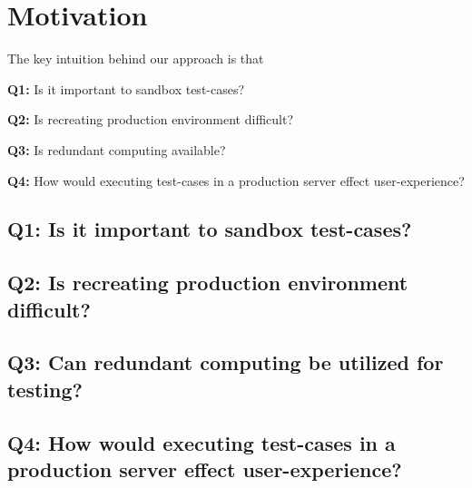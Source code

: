 
\section{Motivation}

The key intuition behind our approach is that \\


\begin{compactitem}
\setlength{\itemsep}{0pt}
\item[]\textbf{Q1:} Is it important to sandbox test-cases?
\item[]\textbf{Q2:} Is recreating production environment difficult? 
\item[]\textbf{Q3:} Is redundant computing available? 
\item[]\textbf{Q4:} How would executing test-cases in a production server effect user-experience?
\end{compactitem}

\subsection{\textbf{Q1:} Is it important to sandbox test-cases?}
\subsection{\textbf{Q2:} Is recreating production environment difficult?}
\subsection{\textbf{Q3:} Can redundant computing be utilized for testing?}
\subsection{\textbf{Q4:} How would executing test-cases in a production server effect user-experience?}
